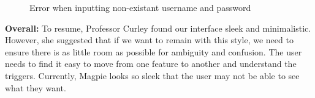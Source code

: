 \begin{figure}
    \centering
    \caption{Error when inputting non-existant username and password}
\end{figure}
\textbf{Overall: }
To resume, Professor Curley found our interface sleek and minimalistic. However, she suggested that if we want to remain with this style, we need to ensure there is as little room as possible for ambiguity and confusion. The user needs to find it easy to move from one feature to another and understand the triggers. Currently, Magpie looks so sleek that the user may not be able to see what they want.\\ \\

